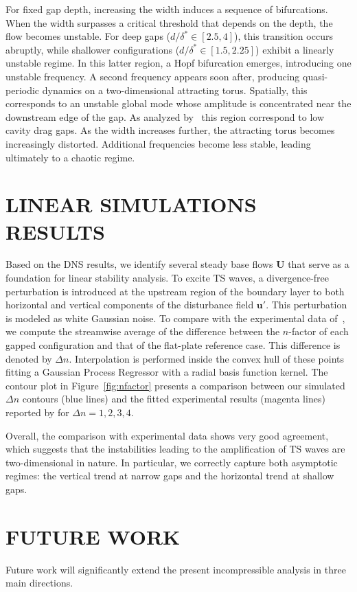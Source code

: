 \documentclass[twocolumn,10pt]{tsfp}
\begin{document}
For fixed gap depth, increasing the width induces a sequence of bifurcations. When the width surpasses a critical threshold that depends on the depth, the flow becomes unstable. For deep gaps ($d/\delta^* \in [2.5, 4]$), this transition occurs abruptly, while shallower configurations ($d/\delta^* \in [1.5, 2.25]$) exhibit a linearly unstable regime. In this latter region, a Hopf bifurcation emerges, introducing one unstable frequency. A second frequency appears soon after, producing quasi-periodic dynamics on a two-dimensional attracting torus. Spatially, this corresponds to an unstable global mode whose amplitude is concentrated near the downstream edge of the gap. As analyzed by~\cite{GharibRoshko1987} this region correspond to low cavity drag gaps. As the width increases further, the attracting torus becomes increasingly distorted. Additional frequencies become less stable, leading ultimately to a chaotic regime.

\section*{LINEAR SIMULATIONS RESULTS}
Based on the DNS results, we identify several steady base flows $\mathbf{U}$ that serve as a foundation for linear stability analysis. To excite TS waves, a divergence-free perturbation is introduced at the upstream region of the boundary layer to both horizontal and vertical components of the disturbance field $\mathbf{u}'$. This perturbation is modeled as white Gaussian noise. To compare with the experimental data of~\cite{jeffGaps}, we compute the streamwise average of the difference between the $n$-factor of each gapped configuration and that of the flat-plate reference case. This difference is denoted by $\Delta n$. Interpolation is performed inside the convex hull of these points fitting a Gaussian Process Regressor with a radial basis function kernel. The contour plot in Figure~\ref{fig:nfactor} presents a comparison between our simulated $\Delta n$ contours (blue lines) and the fitted experimental results (magenta lines) reported by \cite{jeffGaps} for $\Delta n=1,2,3,4$.

Overall, the comparison with experimental data shows very good agreement, which suggests that the instabilities leading to the amplification of TS waves are two-dimensional in nature. In particular, we correctly capture both asymptotic regimes: the vertical trend at narrow gaps and the horizontal trend at shallow gaps.

\section*{FUTURE WORK}
Future work will significantly extend the present incompressible analysis in three main directions. 
\end{document}
